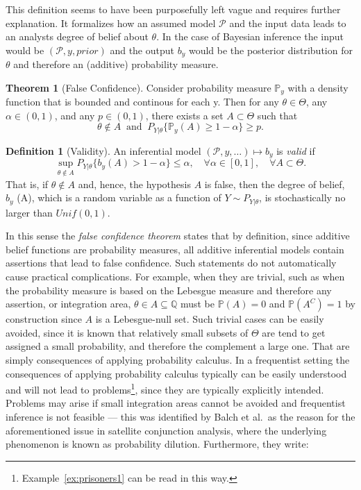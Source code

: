 \documentclass[
]{report}
\theoremstyle{definition}
\newtheorem{theorem}{Theorem}
\theoremstyle{definition}
\newtheorem{definition}{Definition}[section]
\begin{document}
This definition seems to have been purposefully left vague and requires
further explanation. It formalizes how an assumed model \(\mathscr{P}\)
and the input data leads to an analysts degree of belief about
\(\theta\). In the case of Bayesian inference the input would be
\((\mathscr{P}, y, prior)\) and the output \(b_y\) would be the
posterior distribution for \(\theta\) and therefore an (additive)
probability measure.

\begin{theorem}[False Confidence] Consider probability measure $\mathbb{P}_y$ with a density function that is bounded and continous for each y. Then for any $\theta \in \Theta$, any $\alpha \in (0,1)$, and any $p \in (0,1)$, there exists a set $A \subset \Theta$ such that
$$\theta \notin A  \ \text{ and } \ P_{Y| \theta} \{\mathbb{P}_y (A) \geq 1 - \alpha \} \geq p.$$
\end{theorem}

\begin{definition}[Validity]\label{def:validity}
An inferential model $( \mathscr{P},y, \dots) \mapsto b_y$ is \textit{valid} if
$$\sup_{\theta \notin A} P_{Y|\theta} \{b_y (A) > 1- \alpha \} \leq \alpha , \quad \forall \alpha \in [0, 1], \quad \forall A \subset \Theta .$$
That is, if $\theta \notin A$ and, hence, the hypothesis $A$ is false, then the degree of belief, $b_y$ (A), which is a random variable as a function of $Y \sim P_{Y|\theta}$, is stochastically no larger than $Unif(0,1)$.
\end{definition}

In this sense the \textit{false confidence theorem} states that by
definition, since additive belief functions are probability measures,
all additive inferential models contain assertions that lead to false
confidence. Such statements do not automatically cause practical
complications. For example, when they are trivial, such as when the
probability measure is based on the Lebesgue measure and therefore any
assertion, or integration area, \(\theta \in A \subseteq \mathbb{Q}\)
must be \(\mathbb{P}(A) = 0\) and \(\mathbb{P}(A^C) = 1\) by
construction since \(A\) is a Lebesgue-null set. Such trivial cases can
be easily avoided, since it is known that relatively small subsets of
\(\Theta\) are tend to get assigned a small probability, and therefore
the complement a large one. That are simply consequences of applying
probability calculus. In a frequentist setting the consequences of
applying probability calculus typically can be easily understood and
will not lead to
problems\footnote{Example~\ref{ex:prisoners1} can be read in this way.},
since they are typically explicitly intended. Problems may arise if
small integration areas cannot be avoided and frequentist inference is
not feasible --- this was identified by Balch et al.~as the reason for
the aforementioned issue in satellite conjunction analysis, where the
underlying phenomenon is known as probability dilution. Furthermore,
they write:
\end{document}
